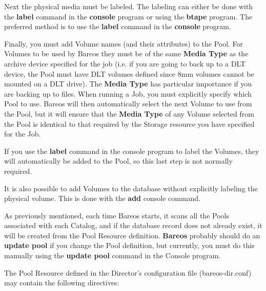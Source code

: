 Next the physical media must be labeled. The labeling can either be done with
the {\bf label} command in the {\bf console} program or using the {\bf btape}
program. The preferred method is to use the {\bf label} command in the {\bf
console} program.

Finally, you must add Volume names (and their attributes) to the Pool. For
Volumes to be used by Bareos they must be of the same {\bf Media Type} as the
archive device specified for the job (i.e. if you are going to back up to a
DLT device, the Pool must have DLT volumes defined since 8mm volumes cannot be
mounted on a DLT drive). The {\bf Media Type} has particular importance if you
are backing up to files. When running a Job, you must explicitly specify which
Pool to use. Bareos will then automatically select the next Volume to use from
the Pool, but it will ensure that the {\bf Media Type} of any Volume selected
from the Pool is identical to that required by the Storage resource you have
specified for the Job.

If you use the {\bf label} command in the console program to label the
Volumes, they will automatically be added to the Pool, so this last step is
not normally required.

It is also possible to add Volumes to the database without explicitly labeling
the physical volume. This is done with the {\bf add} console command.

As previously mentioned, each time Bareos starts, it scans all the Pools
associated with each Catalog, and if the database record does not already
exist, it will be created from the Pool Resource definition. {\bf Bareos}
probably should do an {\bf update pool} if you change the Pool definition, but
currently, you must do this manually using the {\bf update pool} command in
the Console program.

The Pool Resource defined in the Director's configuration file
(bareos-dir.conf) may contain the following directives:

